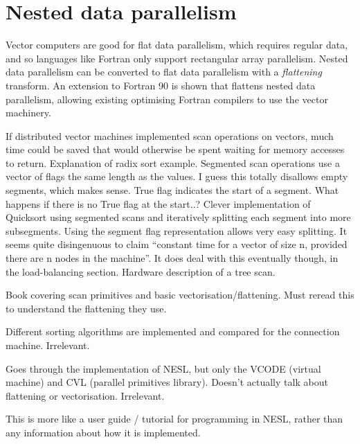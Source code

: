 \section{Nested data parallelism}

Vector computers are good for flat data parallelism, which requires regular data, and so languages like Fortran only support rectangular array parallelism.
Nested data parallelism can be converted to flat data parallelism with a \emph{flattening} transform.
An extension to Fortran 90 is shown that flattens nested data parallelism, allowing existing optimising Fortran compilers to use the vector machinery.

If distributed vector machines implemented scan operations on vectors, much time could be saved that would otherwise be spent waiting for memory accesses to return.
Explanation of radix sort example.
Segmented scan operations use a vector of flags the same length as the values. I guess this totally disallows empty segments, which makes sense. True flag indicates the start of a segment. What happens if there is no True flag at the start..?
Clever implementation of Quicksort using segmented scans and iteratively splitting each segment into more subsegments. Using the segment flag representation allows very easy splitting.
It seems quite disingenuous to claim ``constant time for a vector of size n, provided there are n nodes in the machine''. It does deal with this eventually though, in the load-balancing section.
Hardware description of a tree scan.

Book covering scan primitives and basic vectorisation/flattening.
Must reread this to understand the flattening they use.

Different sorting algorithms are implemented and compared for the connection machine. Irrelevant.

Goes through the implementation of NESL, but only the VCODE (virtual machine) and CVL (parallel primitives library).
Doesn't actually talk about flattening or vectorisation.
Irrelevant.

This is more like a user guide / tutorial for programming in NESL, rather than any information about how it is implemented.

